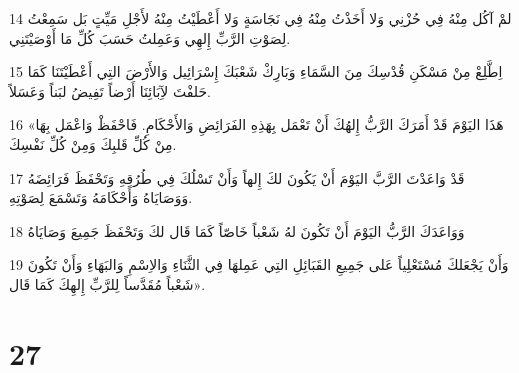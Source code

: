 \par 14 لمْ آكُل مِنْهُ فِي حُزْنِي وَلا أَخَذْتُ مِنْهُ فِي نَجَاسَةٍ وَلا أَعْطَيْتُ مِنْهُ لأَجْلِ مَيِّتٍ بَل سَمِعْتُ لِصَوْتِ الرَّبِّ إِلهِي وَعَمِلتُ حَسَبَ كُلِّ مَا أَوْصَيْتَنِي.
\par 15 اِطَّلِعْ مِنْ مَسْكَنِ قُدْسِكَ مِنَ السَّمَاءِ وَبَارِكْ شَعْبَكَ إِسْرَائِيل وَالأَرْضَ التِي أَعْطَيْتَنَا كَمَا حَلفْتَ لآِبَائِنَا أَرْضاً تَفِيضُ لبَناً وَعَسَلاً.
\par 16 «هَذَا اليَوْمَ قَدْ أَمَرَكَ الرَّبُّ إِلهُكَ أَنْ تَعْمَل بِهَذِهِ الفَرَائِضِ وَالأَحْكَامِ. فَاحْفَظْ وَاعْمَل بِهَا مِنْ كُلِّ قَلبِكَ وَمِنْ كُلِّ نَفْسِكَ.
\par 17 قَدْ وَاعَدْتَ الرَّبَّ اليَوْمَ أَنْ يَكُونَ لكَ إِلهاً وَأَنْ تَسْلُكَ فِي طُرُقِهِ وَتَحْفَظَ فَرَائِضَهُ وَوَصَايَاهُ وَأَحْكَامَهُ وَتَسْمَعَ لِصَوْتِهِ.
\par 18 وَوَاعَدَكَ الرَّبُّ اليَوْمَ أَنْ تَكُونَ لهُ شَعْباً خَاصّاً كَمَا قَال لكَ وَتَحْفَظَ جَمِيعَ وَصَايَاهُ
\par 19 وَأَنْ يَجْعَلكَ مُسْتَعْلِياً عَلى جَمِيعِ القَبَائِلِ التِي عَمِلهَا فِي الثَّنَاءِ وَالاِسْمِ وَالبَهَاءِ وَأَنْ تَكُونَ شَعْباً مُقَدَّساً لِلرَّبِّ إِلهِكَ كَمَا قَال».

\chapter{27}

